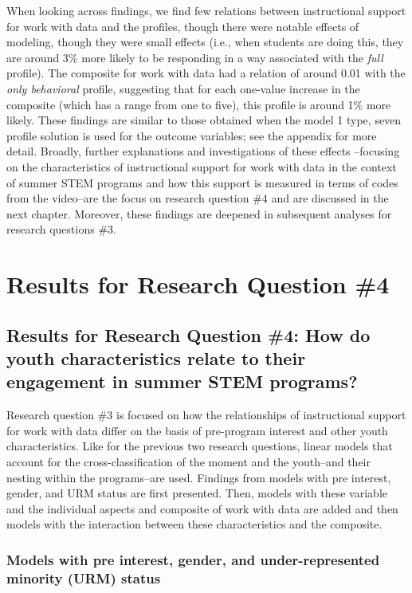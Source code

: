 \documentclass[]{book}
\theoremstyle{definition}
\theoremstyle{definition}
\theoremstyle{definition}
\theoremstyle{remark}
\begin{document}
When looking across findings, we find few relations between
instructional support for work with data and the profiles, though there
were notable effects of modeling, though they were small effects (i.e.,
when students are doing this, they are around 3\% more likely to be
responding in a way associated with the \emph{full} profile). The
composite for work with data had a relation of around 0.01 with the
\emph{only behavioral} profile, suggesting that for each one-value
increase in the composite (which has a range from one to five), this
profile is around 1\% more likely. These findings are similar to those
obtained when the model 1 type, seven profile solution is used for the
outcome variables; see the appendix for more detail. Broadly, further
explanations and investigations of these effects --focusing on the
characteristics of instructional support for work with data in the
context of summer STEM programs and how this support is measured in
terms of codes from the video--are the focus on research question \#4
and are discussed in the next chapter. Moreover, these findings are
deepened in subsequent analyses for research questions \#3.

\chapter{Results for Research Question
\#4}\label{results-for-research-question-4}

\section{Results for Research Question \#4: How do youth characteristics
relate to their engagement in summer STEM
programs?}\label{results-for-research-question-4-how-do-youth-characteristics-relate-to-their-engagement-in-summer-stem-programs}

Research question \#3 is focused on how the relationships of
instructional support for work with data differ on the basis of
pre-program interest and other youth characteristics. Like for the
previous two research questions, linear models that account for the
cross-classification of the moment and the youth--and their nesting
within the programs--are used. Findings from models with pre interest,
gender, and URM status are first presented. Then, models with these
variable and the individual aspects and composite of work with data are
added and then models with the interaction between these characteristics
and the composite.

\subsection{Models with pre interest, gender, and under-represented
minority (URM)
status}\label{models-with-pre-interest-gender-and-under-represented-minority-urm-status}
\end{document}
